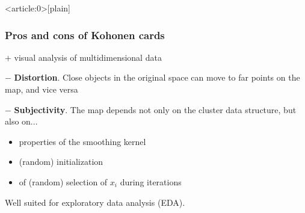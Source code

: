 \documentclass[fullscreen=true, bookmarks=true, hyperref={pdfencoding=unicode}]{beamer}
\begin{document}
{ %
    \begin{frame}<article:0>[plain]
     \end{frame}
}


\begin{frame}[t]
\frametitle{Pros and cons of Kohonen cards}

    $+$ visual analysis of multidimensional data

    $-$ {\bf Distortion}. Close objects in the original space can move to far points on the map, and vice versa

    $-$ {\bf Subjectivity}. The map depends not only on the cluster data structure, but also on...

    \begin{itemize}
      \item properties of the smoothing kernel
      \item (random) initialization
      \item of (random) selection of $x_i$ during iterations
    \end{itemize}

    \pause
    \vspace{1cm}
    Well suited for exploratory data analysis (EDA).
\end{frame}
\end{document}
